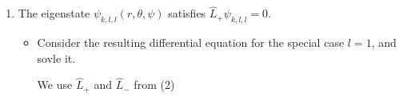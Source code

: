\documentclass[11pt,a4paper]{scrartcl}
\begin{document}
\begin{enumerate}
\begin{itemize}
\begin{calculationbox}
                            $-[\frac{1}{\sin\theta} \frac{\partial}{\partial \theta} (\sin\theta \frac{\partial \psi_{k,l,m}}{\partial \theta}) + \frac{1}{\sin^2 \theta} \frac{\partial^2 \psi_{k,l,m}}{\partial \phi^2}] 
                            = l (l + 1) \psi_{k,l,m}
                            $
                        \end{calculationbox}
                    \item 
                        $\hat{L}_3$ (with eigenvalue $\hbar m$)
                        \begin{calculationbox}
                            $\hat{L}_3 \psi_{k,l,m} 
                            = - i \hbar \frac{\partial \psi_{k,l,m}}{\partial \phi} 
                            = \hbar m \psi_{k,l,m}
                            $

                            $\frac{\partial \psi_{k,l,m}}{\partial \phi} = i m \psi_{k,l,m}$
                        \end{calculationbox}
                \end{itemize}
                must satisfy, \textbf{without solving them}

                Is it always possible to find a solution that satisfies both differential eqations simultaneously?
                \begin{calculationbox}
                    Yes, because commutator $[\hat{L}^2, \hat{L}_3] = 0$ and therefor have common eigenfunctions.
                    \begin{calculationbox}
                        $[\hat{L}^2, \hat{L}_3]$

                        $= [\hat{L}_1^2, \hat{L}_3] + [\hat{L}_2^2, \hat{L}_3] + [\hat{L}_3^2, \hat{L}_3]$

                        $= \hat{L}_1[\hat{L}_1, \hat{L}_3] + [\hat{L}_1, \hat{L}_3] \hat{L}_1 + \hat{L}_2[\hat{L}_2, \hat{L}_3] + [\hat{L}_2, \hat{L}_3] \hat{L}_2$

                        $= \hat{L}_1(-i\hbar \hat{L}_2) + (-i \hbar \hat{L}_2) \hat{L}_1 + \hat{L}_2(i\hbar \hat{L}_1) + (i\hbar \hat{L}_1) \hat{L}_2$
                        
                        $= 0$
                    \end{calculationbox}
                \end{calculationbox}
            
            \item 
                The eigenstate $\psi_{k, l, l}(r, \theta, \psi)$ satisfies $\hat{L}_+ \psi_{k, l, l} = 0$.
                \begin{itemize}
                    \item 
                        Consider the resulting differential equation for the special case $l = 1$, and sovle it.
                        \begin{calculationbox}
                            We use $\hat{L}_+$ and $\hat{L}_-$ from (2)


\end{calculationbox}
\end{itemize}
\end{enumerate}
\end{document}
